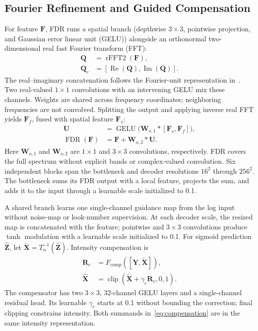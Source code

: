 \documentclass[journal]{IEEEtran}
\newcommand{\vect}[1]{\bm{#1}}
\begin{document}
\subsection{Fourier Refinement and Guided Compensation}
For feature \(\vect{F}\), FDR runs a spatial branch (depthwise \(3\times3\), pointwise projection, and Gaussian error linear unit (GELU)) alongside an orthonormal two-dimensional real fast Fourier transform (FFT):
\begin{equation}
\begin{aligned}
\vect{Q} &= \operatorname{rFFT2}(\vect{F}),\\
\vect{Q}_{c} &= [\operatorname{Re}(\vect{Q}),
                   \operatorname{Im}(\vect{Q})].
\end{aligned}
\label{eq:fft}
\end{equation}
The real--imaginary concatenation follows the Fourier-unit representation in~\cite{chi2020ffc}. Two real-valued \(1\times1\) convolutions with an intervening GELU mix these channels. Weights are shared across frequency coordinates; neighboring frequencies are not convolved. Splitting the output and applying inverse real FFT yields \(\vect{F}_{f}\), fused with spatial feature \(\vect{F}_{s}\):
\begin{equation}
\begin{aligned}
\vect{U} &= \operatorname{GELU}
 \bigl(\vect{W}_{o,1} * [\vect{F}_{s},\vect{F}_{f}]\bigr),\\
\operatorname{FDR}(\vect{F})
 &= \vect{F}+\vect{W}_{o,2}*\vect{U}.
\end{aligned}
\label{eq:fdr}
\end{equation}
Here \(\vect{W}_{o,1}\) and \(\vect{W}_{o,2}\) are \(1\times1\) and \(3\times3\) convolutions, respectively. FDR covers the full spectrum without explicit bands or complex-valued convolution. Six independent blocks span the bottleneck and decoder resolutions \(16^2\) through \(256^2\). The bottleneck sums its FDR output with a local feature, projects the sum, and adds it to the input through a learnable scale initialized to 0.1.

A shared branch learns one single-channel guidance map from the log input without noise-map or look-number supervision. At each decoder scale, the resized map is concatenated with the feature; pointwise and \(3\times3\) convolutions produce \(\tanh\) modulation with a learnable scale initialized to 0.1. For sigmoid prediction \(\widehat{\vect{Z}}\), let \(\widetilde{\vect{X}}=T_{\alpha}^{-1}(\widehat{\vect{Z}})\). Intensity compensation is
\begin{equation}
\begin{aligned}
\vect{R}_{c} &= F_{\mathrm{comp}}
 ([\vect{Y},\widetilde{\vect{X}}]),\\
\widehat{\vect{X}} &= \operatorname{clip}
 (\widetilde{\vect{X}}+\gamma_c\vect{R}_{c},0,1).
\end{aligned}
\label{eq:compensation}
\end{equation}
The compensator has two \(3\times3\), 32-channel GELU layers and a single-channel residual head. Its learnable \(\gamma_c\) starts at 0.1 without bounding the correction; final clipping constrains intensity. Both summands in~\eqref{eq:compensation} are in the same intensity representation.
\end{document}
